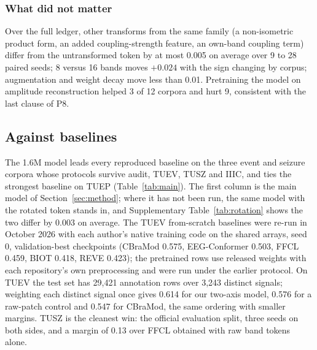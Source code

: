\subsubsection{What did not matter}
Over the full ledger, other transforms from the same family (a non-isometric product form, an added coupling-strength feature, an own-band coupling term) differ from the untransformed token by at most 0.005 on average over 9 to 28 paired seeds; 8 versus 16 bands moves $+0.024$ with the sign changing by corpus; augmentation and weight decay move less than 0.01. Pretraining the model on amplitude reconstruction helped 3 of 12 corpora and hurt 9, consistent with the last clause of P8.

\subsection{Against baselines}
\label{sec:main}
The 1.6M model leads every reproduced baseline on the three event and seizure corpora whose protocols survive audit, TUEV, TUSZ and IIIC, and ties the strongest baseline on TUEP (Table~\ref{tab:main}). The first column is the main model of Section~\ref{sec:method}; where it has not been run, the same model with the rotated token stands in, and Supplementary Table~\ref{tab:rotation} shows the two differ by 0.003 on average. The TUEV from-scratch baselines were re-run in October 2026 with each author's native training code on the shared arrays, seed 0, validation-best checkpoints (CBraMod 0.575, EEG-Conformer 0.503, FFCL 0.459, BIOT 0.418, REVE 0.423); the pretrained rows use released weights with each repository's own preprocessing and were run under the earlier protocol. On TUEV the test set has 29,421 annotation rows over 3,243 distinct signals; weighting each distinct signal once gives 0.614 for our two-axis model, 0.576 for a raw-patch control and 0.547 for CBraMod, the same ordering with smaller margins. TUSZ is the cleanest win: the official evaluation split, three seeds on both sides, and a margin of 0.13 over FFCL obtained with raw band tokens alone.

